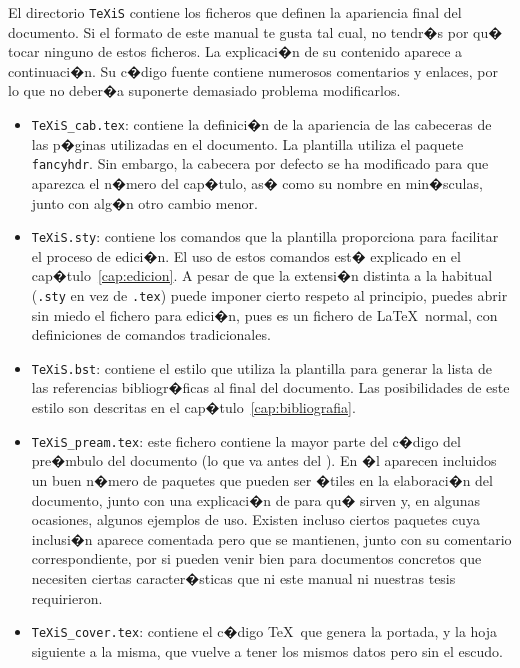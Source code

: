 El directorio \texttt{TeXiS} contiene los ficheros que definen la
apariencia final del documento. Si el formato de este manual te gusta
tal cual, no tendr�s por qu� tocar ninguno de estos ficheros. La
explicaci�n de su contenido aparece a continuaci�n. Su c�digo fuente
contiene numerosos comentarios y enlaces, por lo que no deber�a
suponerte demasiado problema modificarlos.

\begin{itemize}
\item \texttt{TeXiS\_cab.tex}: contiene la definici�n de la apariencia
  de las cabeceras de las p�ginas utilizadas en el documento. La
  plantilla utiliza el paquete \texttt{fancyhdr}. Sin embargo, la
  cabecera por defecto se ha modificado para que aparezca el n�mero
  del cap�tulo, as� como su nombre en min�sculas, junto con alg�n otro
  cambio menor.

\item \texttt{TeXiS.sty}: contiene los comandos que la plantilla
  proporciona para facilitar el proceso de edici�n. El uso de estos
  comandos est� explicado en el cap�tulo~\ref{cap:edicion}. A pesar de
  que la extensi�n distinta a la habitual (\texttt{.sty} en vez de
  \texttt{.tex}) puede imponer cierto respeto al principio, puedes
  abrir sin miedo el fichero para edici�n, pues es un fichero de
  \LaTeX\ normal, con definiciones de comandos tradicionales.

\item \texttt{TeXiS.bst}: contiene el estilo que utiliza la plantilla
  para generar la lista de las referencias bibliogr�ficas al final del
  documento. Las posibilidades de este estilo son descritas en el
  cap�tulo~\ref{cap:bibliografia}.

\item \texttt{TeXiS\_pream.tex}: este fichero contiene la mayor parte
  del c�digo del pre�mbulo del documento (lo que va antes del
  \verb||). En �l aparecen incluidos un buen n�mero de
    paquetes que pueden ser �tiles en la elaboraci�n del documento,
    junto con una explicaci�n de para qu� sirven y, en algunas
    ocasiones, algunos ejemplos de uso. Existen incluso ciertos
    paquetes cuya inclusi�n aparece comentada pero que se mantienen,
    junto con su comentario correspondiente, por si pueden venir bien
    para documentos concretos que necesiten ciertas caracter�sticas
    que ni este manual ni nuestras tesis requirieron.

  \item \texttt{TeXiS\_cover.tex}: contiene el c�digo \TeX\ que genera
    la portada, y la hoja siguiente a la misma, que vuelve a tener los
    mismos datos pero sin el escudo.


\end{itemize}
